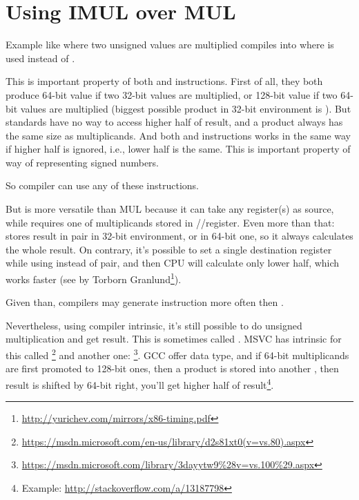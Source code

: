 \section{Using IMUL over MUL}
\label{IMUL_over_MUL}

Example like  where two unsigned values are multiplied compiles into  where \IMUL is used instead of \MUL.

This is important property of both \MUL and \IMUL instructions.
First of all, they both produce 64-bit value if two 32-bit values are multiplied, or 128-bit value if two 64-bit values are multiplied (biggest possible \gls{product} in 32-bit environment is ).
But \CCpp standards have no way to access higher half of result, and a \gls{product} always has the same size as multiplicands. %
And both \MUL and \IMUL instructions works in the same way if higher half is ignored, i.e., lower half is the same.
This is important property of  way of representing signed numbers.

So \CCpp compiler can use any of these instructions.

But \IMUL is more versatile than MUL because it can take any register(s) as source, while \MUL requires one of multiplicands stored in \AX/\EAX/\RAX register.
Even more than that: \MUL stores result in  pair in 32-bit environment, or  in 64-bit one, so it always calculates the whole result.
On contrary, it's possible to set a single destination register while using \IMUL instead of pair, and then \ac{CPU} will calculate only lower half, which works faster (see  by Torborn Granlund\footnote{\url{http://yurichev.com/mirrors/x86-timing.pdf}}).

Given than, \CCpp compilers may generate \IMUL instruction more often then \MUL.

Nevertheless, using compiler intrinsic, it's still possible to do unsigned multiplication and get  result.
This is sometimes called .
MSVC has intrinsic for this called \footnote{\url{https://msdn.microsoft.com/en-us/library/d2s81xt0(v=vs.80).aspx}} and another one: \footnote{\url{https://msdn.microsoft.com/library/3dayytw9%28v=vs.100%29.aspx}}.
GCC offer  data type, and if 64-bit multiplicands are first promoted to 128-bit ones,
then a \gls{product} is stored into another , then result is shifted by 64-bit right, you'll get higher half of result\footnote{Example: \url{http://stackoverflow.com/a/13187798}}.

